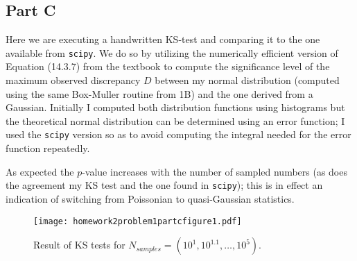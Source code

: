 \subsection{Part C}

Here we are executing a handwritten KS-test and comparing it to the one available from \texttt{scipy}. We do so by utilizing the numerically efficient version of Equation (14.3.7) from the textbook to compute the significance level of the maximum observed discrepancy $D$ between my normal distribution (computed using the same Box-Muller routine from 1B) and the one derived from a Gaussian. Initially I computed both distribution functions using histograms but the theoretical normal distribution can be determined using an error function; I used the \texttt{scipy} version so as to avoid computing the integral needed for the error function repeatedly.

As expected the $p$-value increases with the number of sampled numbers (as does the agreement my KS test and the one found in \texttt{scipy}); this is in effect an indication of switching from Poissonian to quasi-Gaussian statistics.



\clearpage

\begin{figure}[h]
    \centering
    \texttt{[image: homework2problem1partcfigure1.pdf]}
    \caption{Result of KS tests for $N_{samples} = (10^{1}, 10^{1.1}, \dots, 10^{5})$.}
    \label{fig:21c1}
\end{figure}

\clearpage
